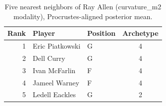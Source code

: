 \begin{table}[htbp]
  \centering\small
  \begin{tabular}{rllc}
    \toprule
    Rank & Player & Position & Archetype \\
    \midrule
    1 & Eric Piatkowski & G & 4 \\
    2 & Dell Curry & G & 4 \\
    3 & Ivan McFarlin & F & 4 \\
    4 & Jameel Warney & F & 4 \\
    5 & Ledell Eackles & G & 2 \\
    \bottomrule
  \end{tabular}
  \caption{Five nearest neighbors of Ray Allen (curvature_m2 modality), Procrustes-aligned posterior mean.}
  \label{tab:Ray_Allen_neighbors_curvature_m2}
\end{table}

